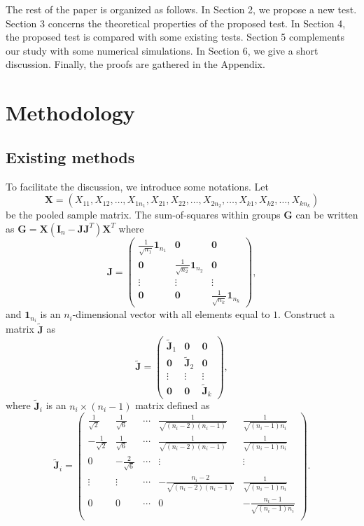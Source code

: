 \documentclass[12pt]{article} %
\newcommand{\bX}{\mathbf{X}}
\newcommand{\bG}{\mathbf{G}}
\newcommand{\bJ}{\mathbf{J}}
\newcommand{\bI}{\mathbf{I}}
\theoremstyle{definition}
\begin{document}
    The rest of the paper is organized  as follows.
    In Section 2, we propose a new test. Section 3 concerns the theoretical properties of the proposed test. In Section 4, the proposed test is compared with some existing tests. Section 5 complements our study with some numerical simulations. In Section 6, we give a short discussion. Finally, the proofs are gathered in the Appendix.




 
\section{Methodology}\label{methodology}
\subsection{Existing methods}
To facilitate the discussion, we introduce some notations.
 Let
 $$\bX=(X_{11},X_{12},\ldots,X_{1n_1},X_{21},X_{22},\ldots,X_{2n_2},\ldots,X_{k1},X_{k2},\ldots,X_{kn_k})$$
 be the pooled sample matrix.
 The sum-of-squares within groups $\bG$ can be written as $\bG=\bX(\bI_n-\bJ\bJ^T)\bX^T$ where
 $$
 \bJ=\begin{pmatrix}
     \frac{1}{\sqrt{n_1}}\mathbf{1}_{n_1}&\mathbf{0} & \mathbf{0}\\
     \mathbf{0}&\frac{1}{\sqrt{n_2}} \mathbf{1}_{n_2}& \mathbf{0}\\
     \vdots &\vdots &\vdots \\
     \mathbf{0}&\mathbf{0}&\frac{1}{\sqrt{n_k}}\mathbf{1}_{n_k}
 \end{pmatrix},
 $$
 and $\mathbf{1}_{n_i}$ is an $n_i$-dimensional vector with all elements equal to $1$.
 Construct a matrix $\tilde{\bJ}$ as 
 $$
 \tilde{\bJ}=\begin{pmatrix}
     \tilde{\bJ}_1&\mathbf{0} & \mathbf{0}\\
     \mathbf{0}&\tilde{\bJ}_2& \mathbf{0}\\
     \vdots &\vdots &\vdots \\
     \mathbf{0}&\mathbf{0}&\tilde{\bJ}_k
 \end{pmatrix},
 $$
 where $\tilde{\bJ}_i$ is an $n_i\times (n_{i}-1)$ matrix defined as
 $$
\tilde{\bJ}_i=\begin{pmatrix}
    \frac{1}{\sqrt{2}}&\frac{1}{\sqrt{6}}&\cdots&\frac{1}{\sqrt{(n_i-2)(n_i-1)}}&\frac{1}{\sqrt{(n_i-1)n_i}}\\
    -\frac{1}{\sqrt{2}}&\frac{1}{\sqrt{6}}&\cdots&\frac{1}{\sqrt{(n_i-2)(n_i-1)}}&\frac{1}{\sqrt{(n_i-1)n_i}}\\
    0&-\frac{2}{\sqrt{6}}&\cdots&\vdots&\vdots\\
    \vdots&\vdots&\cdots&-\frac{n_i-2}{\sqrt{(n_i-2)(n_i-1)}}&\frac{1}{\sqrt{(n_i-1)n_i}}\\
    0&0&\cdots&0&-\frac{n_i-1}{\sqrt{(n_i-1)n_i}}\\
\end{pmatrix}.
 $$
\end{document}
